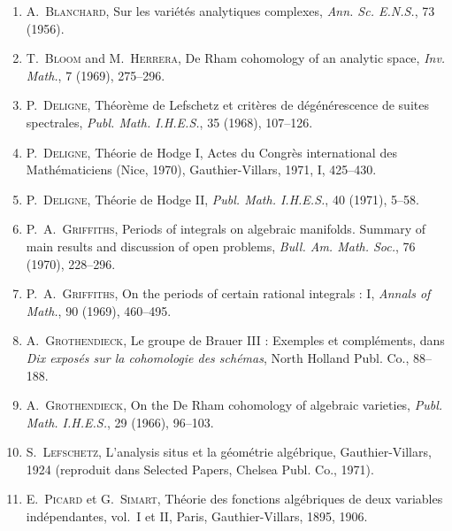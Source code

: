 \documentclass[12pt,a4paper]{amsart}
\theoremstyle{plain}
\theoremstyle{definition}
\theoremstyle{remark}
\numberwithin{equation}{section}
\begin{document}
\begin{enumerate}
\item[{[1]}] A.~\textsc{Blanchard}, Sur les variétés analytiques complexes, \textit{Ann. Sc. E.N.S.}, 73 (1956).

\item[{[2]}] T.~\textsc{Bloom} and M.~\textsc{Herrera}, De Rham cohomology of an analytic space, \textit{Inv. Math.}, 7 (1969), 275--296.

\item[{[3]}] P.~\textsc{Deligne}, Théorème de Lefschetz et critères de dégénérescence de suites spectrales, \textit{Publ. Math. I.H.E.S.}, 35 (1968), 107--126.

\item[{[4]}] P.~\textsc{Deligne}, Théorie de Hodge I, Actes du Congrès international des Mathématiciens (Nice, 1970), Gauthier-Villars, 1971, I, 425--430.

\item[{[5]}] P.~\textsc{Deligne}, Théorie de Hodge II, \textit{Publ. Math. I.H.E.S.}, 40 (1971), 5--58.

\item[{[6]}] P.~A.~\textsc{Griffiths}, Periods of integrals on algebraic manifolds. Summary of main results and discussion of open problems, \textit{Bull. Am. Math. Soc.}, 76 (1970), 228--296.

\item[{[7]}] P.~A.~\textsc{Griffiths}, On the periods of certain rational integrals : I, \textit{Annals of Math.}, 90 (1969), 460--495.

\item[{[8]}] A.~\textsc{Grothendieck}, Le groupe de Brauer III : Exemples et compléments, dans \textit{Dix exposés sur la cohomologie des schémas}, North Holland Publ. Co., 88--188.

\item[{[9]}] A.~\textsc{Grothendieck}, On the De Rham cohomology of algebraic varieties, \textit{Publ. Math. I.H.E.S.}, 29 (1966), 96--103.

\item[{[10]}] S.~\textsc{Lefschetz}, L'analysis situs et la géométrie algébrique, Gauthier-Villars, 1924 (reproduit dans Selected Papers, Chelsea Publ. Co., 1971).

\item[{[11]}] E.~\textsc{Picard} et G.~\textsc{Simart}, Théorie des fonctions algébriques de deux variables indépendantes, vol.~I et II, Paris, Gauthier-Villars, 1895, 1906.


\end{enumerate}
\end{document}
